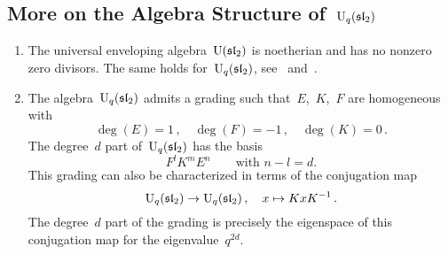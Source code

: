 \documentclass[a4paper, 11pt, oneside]{scrartcl}
\begin{document}
\subsection{More on the Algebra Structure of~\texorpdfstring{$\operatorname{U}_q(\mathfrak{sl}_2)$}{Uq(sl2)}}

\label{algebra structure of quantum sl2}
\begin{remark}
  \leavevmode
  \begin{enumerate}
    \item
      The universal enveloping algebra~$\operatorname{U}(\mathfrak{sl}_2)$ is noetherian and has no nonzero zero divisors.
      The same holds for~$\operatorname{U}_q(\mathfrak{sl}_2)$, see~\cite[Proposition~VI.1.4]{kassel_quantum} and~\cite[Propositon~1.8]{jantzen_quantum}.
    \item
      The algebra~$\operatorname{U}_q(\mathfrak{sl}_2)$ admits a grading such that~$E$,~$K$,~$F$ are homogeneous with
      \[
        \deg(E) = 1 \,,
        \quad
        \deg(F) = -1 \,,
        \quad
        \deg(K) = 0 \,.
      \]
      The degree~$d$ part of~$\operatorname{U}_q(\mathfrak{sl}_2)$ has the basis
      \[
        F^l K^m E^n
        \qquad
        \text{with~$n - l = d$.}
      \]
      This grading can also be characterized in terms of the conjugation map
      \[
        \operatorname{U}_q(\mathfrak{sl}_2)
        \to
        \operatorname{U}_q(\mathfrak{sl}_2) \,,
        \quad
        x
        \mapsto
        K x K^{-1} \,.
      \]
      The degree~$d$ part of the grading is precisely the eigenspace of this conjugation map for the eigenvalue~$q^{2d}$.
  \end{enumerate}
\end{remark}
\end{document}
